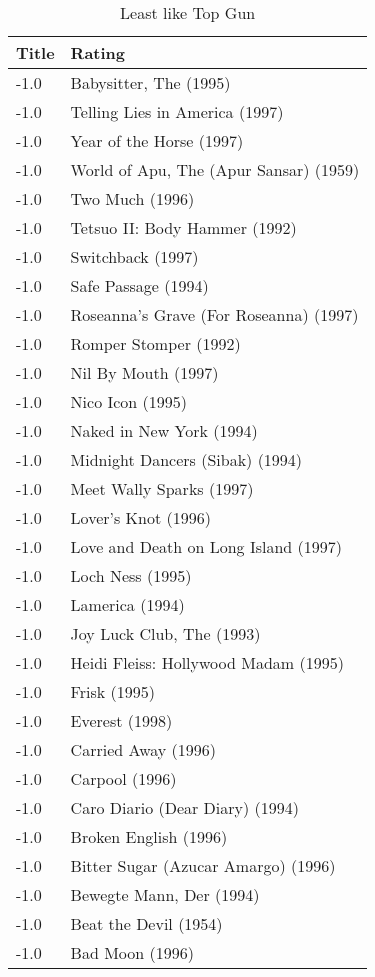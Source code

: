 \begin{table}[h!]
\centering
\begin{tabular}{| l | l |}
\hline
Title & Rating \\
\hline
-1.0 & Babysitter, The (1995) \\
-1.0 & Telling Lies in America (1997) \\
-1.0 & Year of the Horse (1997) \\
-1.0 & World of Apu, The (Apur Sansar) (1959) \\
-1.0 & Two Much (1996) \\
-1.0 & Tetsuo II: Body Hammer (1992) \\
-1.0 & Switchback (1997) \\
-1.0 & Safe Passage (1994) \\
-1.0 & Roseanna's Grave (For Roseanna) (1997) \\
-1.0 & Romper Stomper (1992) \\
-1.0 & Nil By Mouth (1997) \\
-1.0 & Nico Icon (1995) \\
-1.0 & Naked in New York (1994) \\
-1.0 & Midnight Dancers (Sibak) (1994) \\
-1.0 & Meet Wally Sparks (1997) \\
-1.0 & Lover's Knot (1996) \\
-1.0 & Love and Death on Long Island (1997) \\
-1.0 & Loch Ness (1995) \\
-1.0 & Lamerica (1994) \\
-1.0 & Joy Luck Club, The (1993) \\
-1.0 & Heidi Fleiss: Hollywood Madam (1995)  \\
-1.0 & Frisk (1995) \\
-1.0 & Everest (1998) \\
-1.0 & Carried Away (1996) \\
-1.0 & Carpool (1996) \\
-1.0 & Caro Diario (Dear Diary) (1994) \\
-1.0 & Broken English (1996) \\
-1.0 & Bitter Sugar (Azucar Amargo) (1996) \\
-1.0 & Bewegte Mann, Der (1994) \\
-1.0 & Beat the Devil (1954) \\
-1.0 & Bad Moon (1996) \\
\hline
\end{tabular}
\caption{Least like Top Gun}
\label{tab:lltg}
\end{table}

